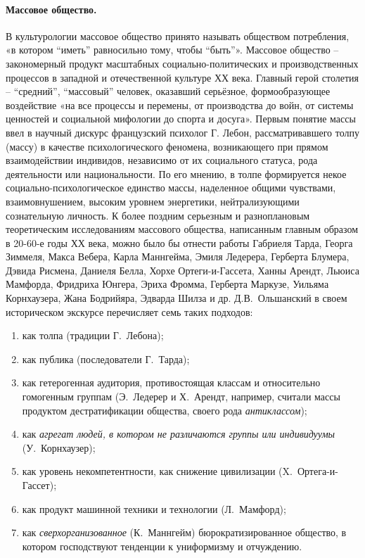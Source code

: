 \paragraph{Массовое общество.}\label{1.1.1}

В культурологии массовое общество принято называть обществом потребления, «в котором “иметь” равносильно тому, чтобы “быть”».\autocite[][199]{razlogov2005} Массовое общество – закономерный продукт масштабных социально-политических  и производственных процессов в западной и отечественной культуре ХХ века. Главный герой столетия – “средний”, “массовый” человек, оказавший серьёзное, формообразующее воздействие «на все процессы и перемены, от производства до войн, от системы ценностей и социальной мифологии до спорта и досуга». \autocite{levada2001} Первым понятие массы ввел в научный дискурс французский психолог Г. Лебон, рассматривавшего толпу (массу) в качестве психологического феномена, возникающего при прямом взаимодействии индивидов, независимо от их социального статуса, рода деятельности или национальности. По его мнению, в толпе формируется некое социально-психологическое единство массы, наделенное общими чувствами, взаимовнушением, высоким уровнем энергетики, нейтрализующими сознательную личность. К более поздним серьезным и разноплановым теоретическим исследованиям массового общества, написанным главным образом в 20-60-е годы ХХ века, можно было бы отнести работы Габриеля Тарда, Георга Зиммеля,
Макса Вебера, Карла Маннгейма, Эмиля Ледерера, Герберта Блумера, Дэвида Рисмена,
Даниеля Белла, Хорхе Ортеги-и-Гассета, Ханны Арендт, Льюиса Мамфорда, Фридриха Юнгера,
Эриха Фромма, Герберта Маркузе, Уильяма Корнхаузера, Жана Бодрийяра, Эдварда Шилза и др. Д.В.~Ольшанский в своем историческом экскурсе\autocite[][15]{olshansky}
перечисляет семь таких подходов:
\begin{enumerate}[label={\arabic*)}]
    \item как толпа (традиции Г.~Лебона);
    \item как публика (последователи Г.~Тарда);
    \item как гетерогенная аудитория, противостоящая классам и относительно гомогенным
    группам (Э.~Ледерер и Х.~Арендт, например, считали массы продуктом дестратификации
    общества, своего рода \emph{антиклассом});
    \item как \emph{агрегат людей, в котором не различаются группы или индивидуумы} (У.~Корнхаузер);
    \item как уровень некомпетентности, как снижение цивилизации (X.~Ортега-и-Гассет);
    \item как продукт машинной техники и технологии (Л.~Мамфорд);
    \item как \emph{сверхорганизованное} (К.~Маннгейм) бюрократизированное общество,
    в котором господствуют тенденции к униформизму и отчуждению.
\end{enumerate}

